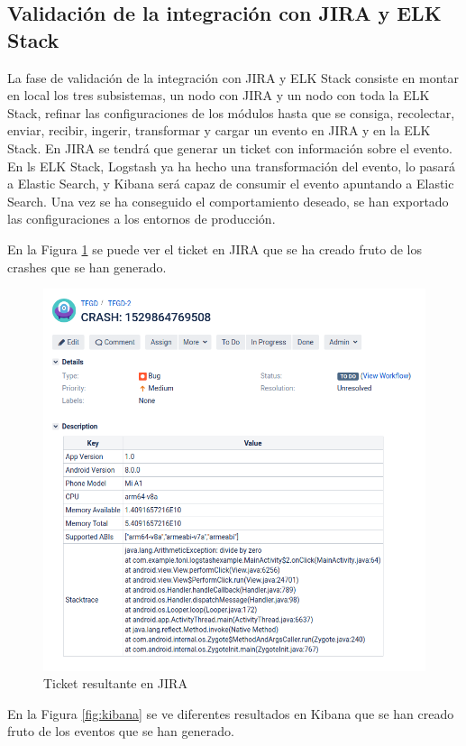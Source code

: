 \subsection{Validación de la integración con JIRA y ELK Stack}
La fase de validación de la integración con JIRA y ELK Stack consiste en montar en local los tres subsistemas, un nodo con JIRA y un nodo con toda la ELK Stack, refinar las configuraciones de los módulos hasta que se consiga, recolectar, enviar, recibir, ingerir, transformar y cargar un evento en JIRA y en la ELK Stack. En JIRA se tendrá que generar un ticket con información sobre el evento. En ls ELK Stack, Logstash ya ha hecho una transformación del evento, lo pasará a Elastic Search, y Kibana será capaz de consumir el evento apuntando a Elastic Search. Una vez se ha conseguido el comportamiento deseado, se han exportado las configuraciones a los entornos de producción.

En la Figura \ref{fig:jira} se puede ver el ticket en JIRA que se ha creado fruto de los crashes que se han generado.

\begin{figure}[H]
	\centering
	\includegraphics[scale=0.4] {jira.png}
	\caption{Ticket resultante en JIRA}
	\label{fig:jira}
\end{figure}

En la Figura \ref{fig:kibana} se ve diferentes resultados en Kibana que se han creado fruto de los eventos que se han generado.


